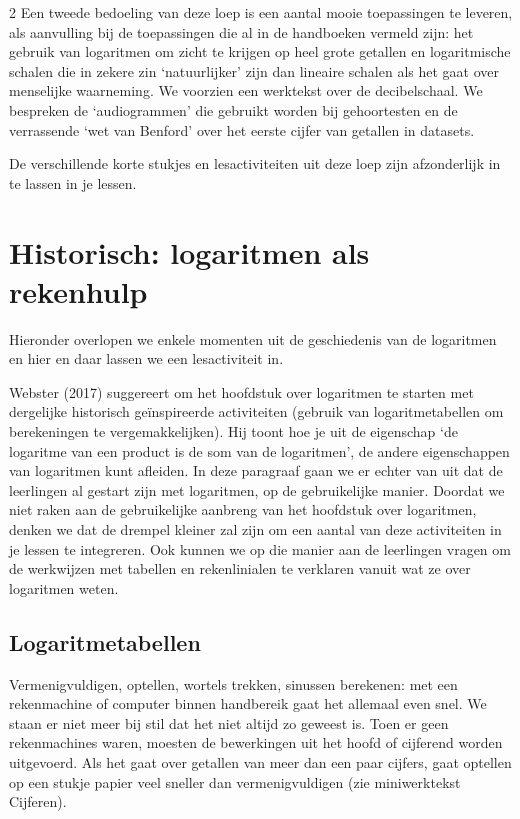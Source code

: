 \begin{multicols}{2}
Een tweede bedoeling van deze loep is een aantal mooie toepassingen te leveren, als aanvulling bij de toepassingen die al in de handboeken vermeld zijn: het gebruik van logaritmen om zicht te krijgen op heel grote getallen en logaritmische schalen die in zekere zin `natuurlijker’ zijn dan lineaire schalen als het gaat over menselijke waarneming. We voorzien een  werktekst over de decibelschaal. We bespreken de `audiogrammen' die gebruikt worden bij gehoortesten en de verrassende `wet van Benford' over het eerste cijfer van getallen in datasets.

De verschillende korte stukjes en lesactiviteiten uit deze loep zijn afzonderlijk in te lassen in je lessen. 

\section{Historisch: logaritmen als rekenhulp}

Hieronder overlopen we enkele momenten uit de geschiedenis van de logaritmen en hier en daar lassen we een lesactiviteit in.

Webster (2017) suggereert om het hoofdstuk over logaritmen te starten met dergelijke historisch \mbox{geïnspireerde} activiteiten (gebruik van logaritmetabellen om berekeningen te vergemakkelijken). Hij toont hoe je uit de eigenschap `de logaritme van een product is de som van de logaritmen', de andere eigenschappen van logaritmen kunt afleiden. In deze paragraaf gaan we er echter van uit dat de leerlingen al gestart zijn met logaritmen, op de gebruikelijke manier. Doordat we niet raken aan de gebruikelijke aanbreng van het hoofdstuk over logaritmen, denken we dat de drempel kleiner zal zijn om een aantal van deze activiteiten in je lessen te integreren. Ook kunnen we op die manier aan de leerlingen vragen om de werkwijzen met tabellen en rekenlinialen te verklaren vanuit wat ze over logaritmen weten.
\subsection{Logaritmetabellen}

Vermenigvuldigen, optellen, wortels trekken, sinussen berekenen: met een rekenmachine of computer binnen handbereik gaat het allemaal even snel. We staan er niet meer bij stil dat het niet altijd zo geweest is. Toen er geen rekenmachines waren, moesten de bewerkingen uit het hoofd of cijferend worden uitgevoerd. Als het gaat over getallen van meer dan een paar cijfers, gaat optellen op een stukje papier veel sneller dan vermenigvuldigen (zie miniwerktekst Cijferen).

\end{multicols}

